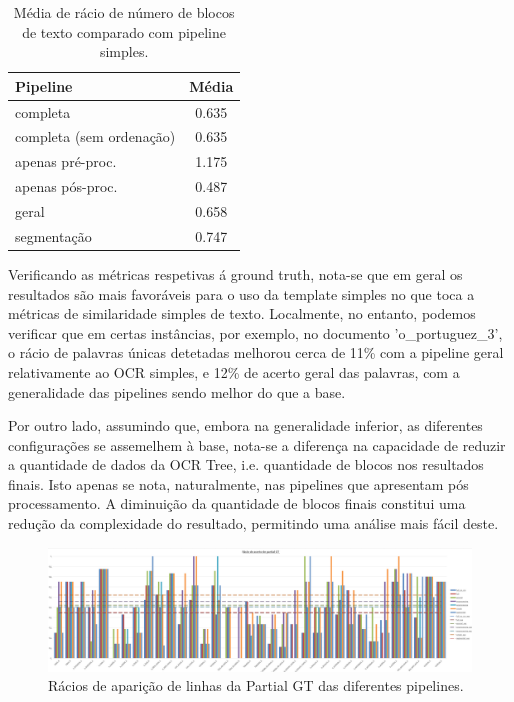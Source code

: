 \begin{table}[H]
	\centering
	\begin{tabular}{|l|c|}
		\hline
		\textbf{Pipeline} & \textbf{Média} \\ \hline
		completa & 0.635 				   \\ \hline
		completa (sem ordenação) & 0.635   \\ \hline
		apenas pré-proc. & 1.175 		   \\ \hline
		apenas pós-proc. & 0.487 		   \\ \hline
		geral & 0.658 					   \\ \hline
		segmentação & 0.747 			   \\ \hline
	\end{tabular}
	\caption{Média de rácio de número de blocos de texto comparado com pipeline simples.}
\end{table}




Verificando as métricas respetivas á ground truth, nota-se que em geral os resultados são mais favoráveis para o uso da template simples no que toca a métricas de similaridade simples de texto. Localmente, no entanto, podemos verificar que em certas instâncias, por exemplo, no documento 'o\_portuguez\_3', o rácio de palavras únicas detetadas melhorou cerca de 11\% com a pipeline geral relativamente ao OCR simples, e 12\% de acerto geral das palavras, com a generalidade das pipelines sendo melhor do que a base.

Por outro lado, assumindo que, embora na generalidade inferior, as diferentes configurações se assemelhem à base, nota-se a diferença na capacidade de reduzir a quantidade de dados da OCR Tree, i.e. quantidade de blocos nos resultados finais. Isto apenas se nota, naturalmente, nas pipelines que apresentam pós processamento. A diminuição da quantidade de blocos finais constitui uma redução da complexidade do resultado, permitindo uma análise mais fácil deste.



\begin{figure}[H]
	\centering
	\hspace*{-2cm}
	\includegraphics[width=1.2\textwidth]{images/resultados/graph_pgt_hit_ratio.png}
	\caption{Rácios de aparição de linhas da Partial GT das diferentes pipelines.}
	\label{fig:graph_pgt_hit_ratio}
\end{figure}


